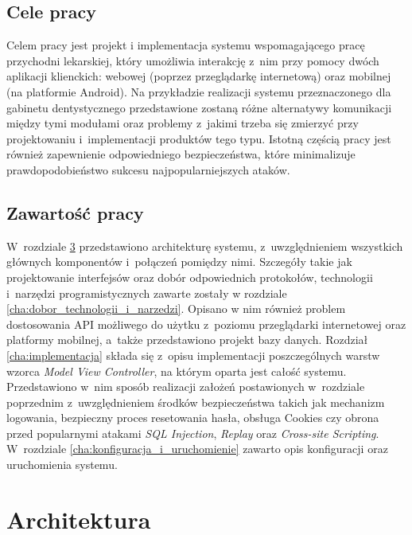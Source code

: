 \documentclass[11pt]{aghdpl}
\begin{document}
\section{Cele pracy}
\label{sec:cele_pracy}

Celem pracy jest projekt i implementacja systemu wspomagającego pracę przychodni lekarskiej, który umożliwia interakcję z~nim przy pomocy dwóch aplikacji klienckich: webowej (poprzez przeglądarkę internetową) oraz mobilnej (na platformie Android). Na przykładzie realizacji systemu przeznaczonego dla gabinetu dentystycznego przedstawione zostaną różne alternatywy komunikacji między tymi modułami oraz problemy z~jakimi trzeba się zmierzyć przy projektowaniu i~implementacji produktów tego typu. Istotną częścią pracy jest również zapewnienie odpowiedniego bezpieczeństwa, które minimalizuje prawdopodobieństwo sukcesu najpopularniejszych ataków.

\section{Zawartość pracy}
\label{sec:zawartosc_pracy}

W~rozdziale \ref{cha:architektura} przedstawiono architekturę systemu, z~uwzględnieniem wszystkich głównych komponentów i~połączeń pomiędzy nimi. Szczegóły takie jak projektowanie interfejsów oraz dobór odpowiednich protokołów, technologii i~narzędzi programistycznych zawarte zostały w rozdziale \ref{cha:dobor_technologii_i_narzedzi}. Opisano w nim również problem dostosowania API możliwego do użytku z~poziomu przeglądarki internetowej oraz platformy mobilnej, a~także przedstawiono projekt bazy danych. Rozdział \ref{cha:implementacja} składa się z~opisu implementacji poszczególnych warstw wzorca \emph{Model View Controller}, na którym oparta jest całość systemu. Przedstawiono w~nim sposób realizacji założeń postawionych w~rozdziale poprzednim z~uwzględnieniem środków bezpieczeństwa takich jak mechanizm logowania, bezpieczny proces resetowania hasła, obsługa Cookies czy obrona przed popularnymi atakami \emph{SQL Injection}, \emph{Replay} oraz \emph{Cross-site Scripting}. W~rozdziale \ref{cha:konfiguracja_i_uruchomienie} zawarto opis konfiguracji oraz uruchomienia systemu.


\chapter{Architektura}
\label{cha:architektura}
\end{document}
